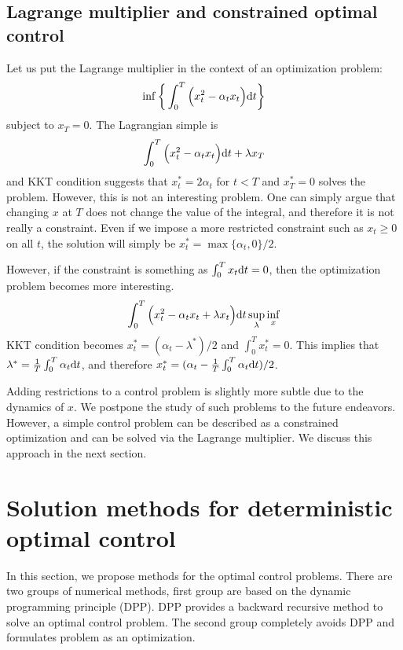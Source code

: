 \documentclass[11pt]{book}
\newcommand{\dt}{\text{\normalfont d}t}
\begin{document}
\subsection{Lagrange multiplier and constrained optimal control}
Let us put the Lagrange multiplier in the context of an optimization problem:
    \begin{equation}
        \inf\bigg\{\int_0^T\Big(x_t^2 - \alpha_t x_t\Big) {{\dt}}\bigg\}
    \end{equation}
subject to $x_T=0$. The Lagrangian simple is
\begin{equation}
    \int_0^T\Big(x_t^2 - \alpha_t x_t\Big) {{\dt}} + \lambda x_T
\end{equation}
and KKT condition suggests that $x^*_t=2\alpha_t$ for $t<T$ and $x^*_T=0$ solves the problem. However, this is not an interesting problem. One can simply argue that changing $x$ at $T$ does not change the value of the integral, and therefore it is not really a constraint. Even if we impose a more restricted constraint such as $x_t\ge0$ on all $t$, the solution will simply be $x^*_t=\max\{\alpha_t,0\}/2$.

However, if the constraint is something as $\int_0^T x_t{{\dt}} = 0$, then the optimization problem becomes more interesting.
\begin{equation}
        \int_0^T\Big(x_t^2 - \alpha_t x_t + \lambda x_t\Big) {{\dt}} 
\sup_{\lambda}\inf_{x}\end{equation}
KKT condition becomes $x^*_t =   (\alpha_t - \lambda^* )/2$ and $\int_0^Tx^*_t=0$. This implies that $\lambda^* = \frac{1}{T}\int_0^T\alpha_t{{\dt}}$, and therefore $x^*_t =   (\alpha_t - \frac{1}{T}\int_0^T\alpha_t{{\dt}} )/2$. 

Adding restrictions to a control problem is slightly more subtle due to the dynamics of $x$. We postpone the study of such problems to the future endeavors. However, a simple control problem can be described as a constrained optimization and can be solved via the Lagrange multiplier. We discuss this approach in the next section.


\section{Solution methods for deterministic optimal control}
\label{sec:sol_deter}
In this section, we propose methods for the optimal control problems. There are two groups of numerical methods, first group are based on the dynamic programming principle (DPP). DPP provides a backward recursive method to solve an optimal control problem.  The second group completely avoids DPP and formulates problem as an optimization. 
\end{document}
